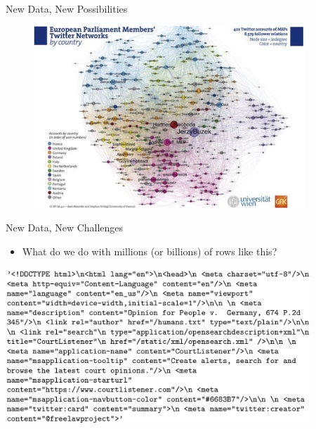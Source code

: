 \documentclass[english]{beamer}
\begin{document}
\begin{frame}{New Data, New Possibilities}
\begin{figure}[h]
\begin{centering}
\includegraphics[height=2.7in]{Images/fig2}
\end{centering}
\end{figure}
\end{frame}

\begin{frame}{New Data, New Challenges}
\begin{itemize}
\item   What do we do with millions (or billions) of rows like this?
\end{itemize}
\vspace{-15pt}
\begin{center}
\includegraphics[height=2.3in]{Images/fig3}
\end{center}
\end{frame}
\end{document}
